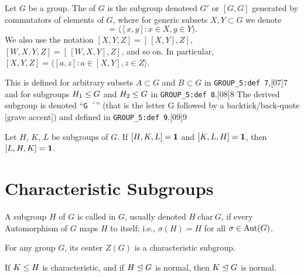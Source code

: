 \begin{definition}\index{$[G,G]$}
Let $G$ be a group. The  of $G$ is the subgroup
denoteed $G'$ or $[G,G]$ generated by commutators of elements of $G$, where
for generic subsets $X,Y\subset G$ we denote
\begin{equation}
  [X,Y] = \langle [x,y] : x\in X,y\in Y\rangle.
\end{equation}
We also use the notation $[X,Y,Z] = [\,{[X,Y]},Z]$, $[W,X,Y,Z] = [\,{[W,X,Y]},Z]$,
and so on. In particular, $[X,Y,Z] = \langle [a,z] : a\in[X,Y], z\in Z\rangle$.
\end{definition}

\begin{remark}
This is defined for arbitrary subsets $A\subset G$ and $B\subset G$ in
\verb#GROUP_5:def 7#,[07]{7} and for subgroups $H_{1}\leq G$ and
$H_{2}\leq G$ in \verb#GROUP_5:def 8#.[08]{8} The derived subgroup is
denoted ``\verb#G `#'' (that is the letter G followed by a
backtick/back-quote [grave accent]) and defined in \verb#GROUP_5:def 9#.[09]{9}
\end{remark}


\begin{theorem}
  Let $H$, $K$, $L$ be subgroups of $G$.
  If $[H,K,L]=\mathbf{1}$ and $[K,L,H]=\mathbf{1}$,
  then $[L,H,K]=\mathbf{1}$.
\end{theorem}

\section{Characteristic Subgroups}

\begin{definition}
A subgroup $H$ of $G$ is called  in $G$, usually
denoted $H~\mathrm{char}~G$, if every Automorphism of $G$ maps $H$ to
itself; i.e., $\sigma(H)=H$ for all $\sigma\in\operatorname{Aut}(G)$.
\end{definition}

\begin{theorem}
For any group $G$, its center $Z(G)$ is a characteristic subgroup.
\end{theorem}

\begin{theorem}
If $K\leq H$ is characteristic, and if $H\trianglelefteq G$ is normal,
then $K\trianglelefteq G$ is normal.
\end{theorem}

